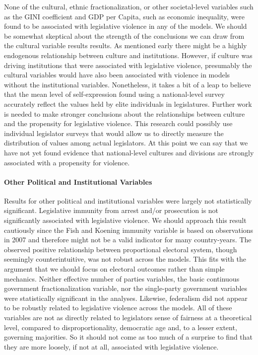\documentclass[a4paper]{article}\usepackage{graphicx, color}
\begin{document}
None of the cultural, ethnic fractionalization, or other societal-level variables such as the GINI coefficient and GDP per Capita, such as economic inequality, were found to be associated with legislative violence in any of the models. We should be somewhat skeptical about the strength of the conclusions we can draw from the cultural variable results results. As mentioned early there might be a highly endogenous relationship between culture and institutions. However, if culture was driving institutions that were associated with legislative violence, presumably the cultural variables would have also been associated with violence in models without the institutional variables. Nonetheless, it takes a bit of a leap to believe that the mean level of self-expression found using a national-level survey accurately reflect the values held by elite individuals in legislatures. Further work is needed to make stronger conclusions about the relationships between culture and the propensity for legislative violence. This research could possibly use individual legislator surveys that would allow us to directly measure the distribution of values among actual legislators. At this point we can say that we have not yet found evidence that national-level cultures and divisions are strongly associated with a propensity for violence.

\paragraph{Other Political and Institutional Variables}

Results for other political and institutional variables were largely not statistically significant. Legislative immunity from arrest and/or prosecution is not significantly associated with legislative violence. We should approach this result cautiously since the Fish and Koening immunity variable is based on observations in 2007 and therefore might not be a valid indicator for many country-years. The observed positive relationship between proportional electoral system, though seemingly counterintuitive, was not robust across the models. This fits with the argument that we should focus on electoral outcomes rather than simple mechanics. Neither effective number of parties variables, the basic continuous government fractionalization variable, nor the single-party government variables were statistically significant in the analyses. Likewise, federalism did not appear to be robustly related to legislative violence across the models. All of these variables are not as directly related to legislators sense of fairness at a theoretical level, compared to disproportionality, democratic age and, to a lesser extent, governing majorities. So it should not come as too much of a surprise to find that they are more loosely, if not at all, associated with legislative violence.
\end{document}
